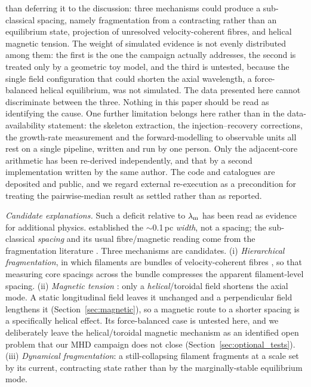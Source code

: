 \documentclass[usenatbib,twoside,twocolumn]{mnras}
\begin{document}
than deferring it to the discussion: three mechanisms could produce a sub-classical spacing, namely fragmentation from a contracting rather than an equilibrium state, projection of unresolved velocity-coherent fibres, and helical magnetic tension. The weight of simulated evidence is not evenly distributed among them: the first is the one the campaign actually addresses, the second is treated only by a geometric toy model, and the third is untested, because the single field configuration that could shorten the axial wavelength, a force-balanced helical equilibrium, was not simulated. The data presented here cannot discriminate between the three. Nothing in this paper should be read as identifying the cause. One further limitation belongs here rather than in the data-availability statement: the skeleton extraction, the injection--recovery corrections, the growth-rate measurement and the forward-modelling to observable units all rest on a single pipeline, written and run by one person. Only the adjacent-core arithmetic has been re-derived independently, and that by a second implementation written by the same author. The code and catalogues are deposited and public, and we regard external re-execution as a precondition for treating the pairwise-median result as settled rather than as reported.

\emph{Candidate explanations.} Such a deficit relative to $\lambda_{\rm m}$ has been read as evidence for additional physics. \citet{Arzoumanian2019} established the $\sim$0.1\,pc \emph{width}, not a spacing; the sub-classical \emph{spacing} and its usual fibre/magnetic reading come from the fragmentation literature \citep{Fischera2012,Zhang2023cal}. Three mechanisms are candidates. (i) \emph{Hierarchical fragmentation}, in which filaments are bundles of velocity-coherent fibres \citep{Hacar2013,Hacar2018,Yang2024}, so that measuring core spacings across the bundle compresses the apparent filament-level spacing. (ii) \emph{Magnetic tension} \citep{Nakamura1993}: only a \emph{helical}/toroidal field shortens the axial mode. A static longitudinal field leaves it unchanged and a perpendicular field lengthens it (Section~\ref{sec:magnetic}), so a magnetic route to a shorter spacing is a specifically helical effect. Its force-balanced case is untested here, and we deliberately leave the helical/toroidal magnetic mechanism as an identified open problem that our MHD campaign does not close (Section~\ref{sec:optional_tests}). (iii) \emph{Dynamical fragmentation}: a still-collapsing filament fragments at a scale set by its current, contracting state rather than by the marginally-stable equilibrium mode.
\end{document}

